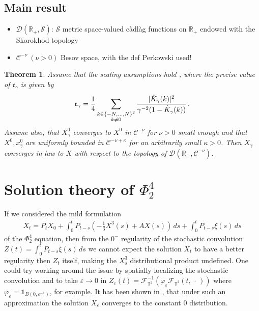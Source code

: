 \documentclass{report}
\newcommand{\RR}{\mathbb{R}}
\newcommand{\TT}{\mathbb{T}}
\DeclarePairedDelimiter\abs{\lvert}{\rvert} %
\newcommand{\CharFunction}[1]{\mathds{1}_{#1}}
\newcommand{\Placeholder}{\,\mathrel{\cdot}\,}
\newtheorem{theorem}{Theorem}[chapter]
\theoremstyle{remark}
\theoremstyle{definition}
\newcommand{\TODO}[1]{\text{\textcolor{red}{TODO: #1}}\xspace}
\let\phi\varphi
\let\epsilon\varepsilon
\begin{document}
\section{Main result}
  \begin{itemize}
    \item $\mathcal{D}(\mathbb{R}_+, \mathcal{S})$: $\mathcal{S}$ metric space-valued càdlàg functions on $\mathbb{R}_+$ endowed with the Skorokhod topology
    \item $\mathcal{C}^{-\nu}~(\nu > 0)$ Besov space, with the def Perkowski used!
  \end{itemize}

\begin{theorem}
  Assume that the scaling assumptions hold \TODO{which scaling assumptions?}, where the precise value of $\mathfrak{c}_\gamma$ is given by\begin{align}
    \mathfrak{c}_\gamma = \frac{1}{4}\sum_{\substack{k \in \left\{-N, \ldots, N\right\}^2\\k\neq 0}}\frac{\abs{\hat{K}_\gamma(k)}^2}{\gamma^{-2} (1 - \hat{K}_\gamma(k))}\,.
  \end{align}
  Assume also, that $X^0_\gamma$ converges to $X^0$ in $\mathcal{C}^{-\nu}$ for $\nu > 0$ small enough and that $X^0, x^0_\gamma$ are uniformly bounded in $\mathcal{C}^{-\nu + \kappa}$ for an arbitrarily small $\kappa > 0$. Then $X_\gamma$ converges in law to $X$ with respect to the topology of $\mathcal{D}(\RR_+, \mathcal{C}^{-\nu})$.
\end{theorem}
\TODO{rough sketch of the proof idea}
\chapter{Solution theory of $\Phi^4_2$}
\label{chapter:solution_theory_of_phi_4_2}
If we considered the mild formulation 
\begin{align}
  X_t = P_t X_0 + \int_{0}^{t}P_{t-s}\left(-\frac{1}{3}X^3(s) + A X(s)\right)\,ds + \int_0^t P_{t-s} \xi(s) \,ds
\end{align}
of the $\Phi^4_2$ equation, then from the $0^-$ regularity of the stochastic convolution $Z(t) = \int_0^t P_{t-s} \xi(s) \,ds$ we cannot expect the solution $X_t$ to have a better regularity then $Z_t$ itself, making the $X^3_s$ distributional product undefined. One could try working around the issue by spatially localizing the stochastic convolution and to take $\epsilon \to 0$ in $Z_\epsilon(t) = \mathcal{F}_{\TT^2}^{-1}(\phi_\epsilon \mathcal{F}_{\TT^2}(t, \Placeholder))$ where $\phi_\epsilon = \CharFunction{B(0, \epsilon^{-1})}$, for example. It has been shown in \cite{hairer2012triviality}, that under such an approximation the solution $X_\epsilon$ converges to the constant $0$ distribution.
\end{document}
